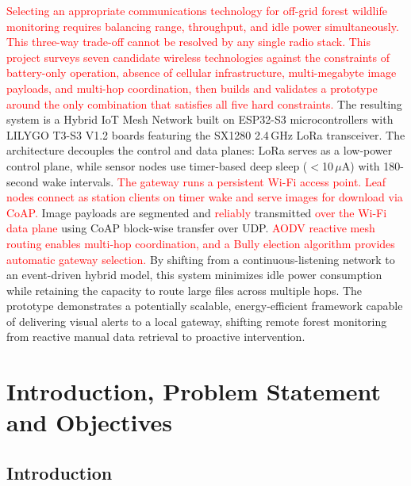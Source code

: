 \documentclass[12pt,a4paper]{article}
\DeclareRobustCommand{\changed}[1]{\textcolor{red}{#1}}
\begin{document}
\changed{Selecting an appropriate communications technology for off-grid forest wildlife monitoring requires balancing range, throughput, and idle power simultaneously. This three-way trade-off cannot be resolved by any single radio stack. This project surveys seven candidate wireless technologies against the constraints of battery-only operation, absence of cellular infrastructure, multi-megabyte image payloads, and multi-hop coordination, then builds and validates a prototype around the only combination that satisfies all five hard constraints.}
The resulting system is a Hybrid IoT Mesh Network built on ESP32-S3 microcontrollers with LILYGO T3-S3 V1.2 boards featuring the SX1280 2.4\,GHz LoRa transceiver. The architecture decouples the control and data planes: LoRa serves as a low-power control plane, while sensor nodes use timer-based deep sleep ($<$10\,$\mu$A) with 180-second wake intervals. \changed{The gateway runs a persistent Wi-Fi access point. Leaf nodes connect as station clients on timer wake and serve images for download via CoAP.} Image payloads are segmented and \changed{reliably} transmitted \changed{over the Wi-Fi data plane} using CoAP block-wise transfer over UDP. \changed{AODV reactive mesh routing enables multi-hop coordination, and a Bully election algorithm provides automatic gateway selection.} By shifting from a continuous-listening network to an event-driven hybrid model, this system minimizes idle power consumption while retaining the capacity to route large files across multiple hops. The prototype demonstrates a potentially scalable, energy-efficient framework capable of delivering visual alerts to a local gateway, shifting remote forest monitoring from reactive manual data retrieval to proactive intervention.

\newpage


\section{Introduction, Problem Statement and Objectives}

\subsection{Introduction}
\end{document}
